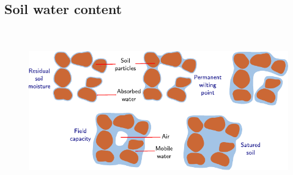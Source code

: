 \subsection{Soil water content} %
\begin{frame}
	\frametitle{\subsecname}
	\begin{figure}[ht!]
		\centering
		\includegraphics[height=6.8cm]{wetness}
	\end{figure}
\end{frame}